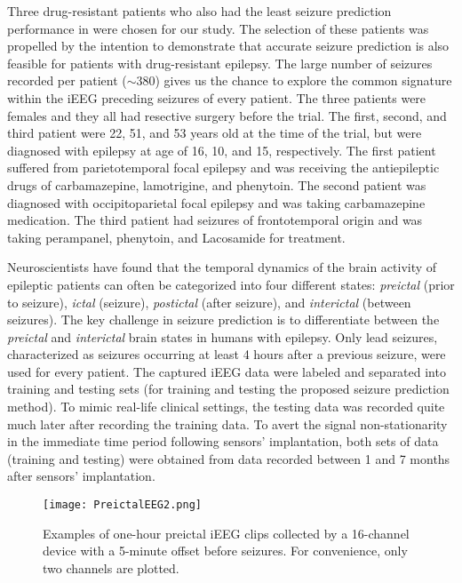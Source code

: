 \documentclass[journal]{IEEEtran}
\begin{document}
Three drug-resistant patients who also had the least seizure prediction performance in \cite{cook2013prediction} were chosen for our study. The selection of these patients was propelled by the intention to demonstrate that accurate seizure prediction is also feasible for patients with drug-resistant epilepsy. The large number of seizures recorded per patient ($\sim$380) gives us the chance to explore the common signature within the iEEG preceding seizures of every patient. The three patients were females and they all had resective surgery before the trial. The first, second, and third patient were 22, 51, and 53 years old at the time of the trial, but were diagnosed with epilepsy at age of 16, 10, and 15, respectively. The first patient suffered from parietotemporal focal epilepsy and was receiving the antiepileptic drugs of carbamazepine, lamotrigine, and phenytoin. The second patient was diagnosed with occipitoparietal focal epilepsy and was taking carbamazepine medication. The third patient had seizures of frontotemporal origin and was taking perampanel, phenytoin, and Lacosamide for treatment.



Neuroscientists have found that the temporal dynamics of the brain activity of epileptic patients can often be categorized into four different states: \textit{preictal} (prior to seizure), \textit{ictal} (seizure), \textit{postictal} (after seizure), and \textit{interictal} (between seizures). The key challenge in seizure prediction is to differentiate between the \textit{preictal} and \textit{interictal} brain states in humans with epilepsy. Only lead seizures, characterized as seizures occurring at least 4 hours after a previous seizure, were used for every patient. The captured iEEG data were labeled and separated into training and testing sets (for training and testing the proposed seizure prediction method). To mimic real-life clinical settings, the testing data was recorded quite much later after recording the training data. To avert the signal non-stationarity in the immediate time period following sensors' implantation, both sets of data (training and testing) were obtained from data recorded between 1 and 7 months after sensors' implantation.

\begin{figure}[!t]\centering
	\texttt{[image: PreictalEEG2.png]}
	\caption{Examples of one-hour preictal iEEG clips collected by a 16-channel device with a 5-minute offset before seizures. For convenience, only two channels are plotted.}
	\label{Fig_PreictalEEG}
\end{figure}
\end{document}
